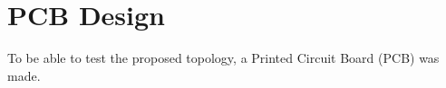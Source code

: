 \chapter{PCB Design}\label{ch:PCB}

To be able to test the proposed topology,
a Printed Circuit Board (PCB) was made.


